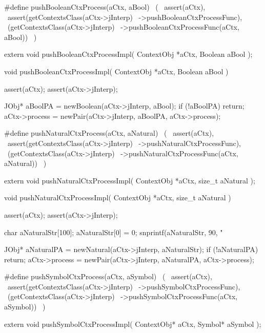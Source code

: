 \startCHeader
#define pushBooleanCtxProcess(aCtx, aBool)      \
  (                                             \
    assert(aCtx),                               \
    assert(getContextsClass(aCtx->jInterp)      \
      ->pushBooleanCtxProcessFunc),             \
    (getContextsClass(aCtx->jInterp)            \
      ->pushBooleanCtxProcessFunc(aCtx, aBool)) \
  )
\stopCHeader

\setCHeaderStream{private}
\startCHeader
extern void pushBooleanCtxProcessImpl(
  ContextObj *aCtx,
  Boolean     aBool
);
\stopCHeader
\setCHeaderStream{public}

\startCCode
void pushBooleanCtxProcessImpl(
  ContextObj *aCtx,
  Boolean     aBool
) {
  assert(aCtx);
  assert(aCtx->jInterp);

  JObj* aBoolPA = newBoolean(aCtx->jInterp, aBool);
  if (!aBoolPA) return;
  aCtx->process = newPair(aCtx->jInterp, aBoolPA, aCtx->process);
}
\stopCCode

\startCHeader
#define pushNaturalCtxProcess(aCtx, aNatural)      \
  (                                                \
    assert(aCtx),                                  \
    assert(getContextsClass(aCtx->jInterp)         \
      ->pushNaturalCtxProcessFunc),                \
    (getContextsClass(aCtx->jInterp)               \
      ->pushNaturalCtxProcessFunc(aCtx, aNatural)) \
  )
\stopCHeader

\startCHeader
extern void pushNaturalCtxProcessImpl(
  ContextObj *aCtx,
  size_t      aNatural
);
\stopCHeader
\setCHeaderStream{public}

\startCCode
void pushNaturalCtxProcessImpl(
  ContextObj *aCtx,
  size_t      aNatural
) {
  assert(aCtx);
  assert(aCtx->jInterp);

  char aNaturalStr[100];
  aNaturalStr[0] = 0;
  snprintf(aNaturalStr, 90, "%
  
  JObj* aNaturalPA = newNatural(aCtx->jInterp, aNaturalStr);
  if (!aNaturalPA) return;
  aCtx->process = newPair(aCtx->jInterp, aNaturalPA, aCtx->process);
}
\stopCCode

\startCHeader
#define pushSymbolCtxProcess(aCtx, aSymbol)      \
  (                                              \
    assert(aCtx),                                \
    assert(getContextsClass(aCtx->jInterp)       \
      ->pushSymbolCtxProcessFunc),               \
    (getContextsClass(aCtx->jInterp)             \
      ->pushSymbolCtxProcessFunc(aCtx, aSymbol)) \
  )
\stopCHeader

\startCHeader
extern void pushSymbolCtxProcessImpl(
  ContextObj* aCtx,
  Symbol* aSymbol
);
\stopCHeader
{}

